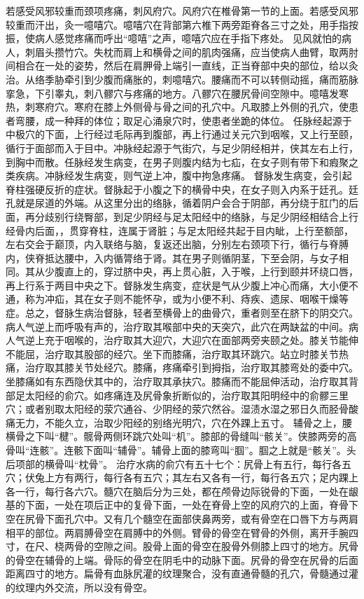 \documentclass[a4paper,12pt,UTF8,twoside]{ctexbook}
\begin{document}
若感受风邪较重而颈项疼痛，刺风府穴。风府穴在椎骨第一节的上面。若感受风邪较重而汗出，灸一噫嘻穴。噫嘻穴在背部第六椎下两旁距脊各三寸之处，用手指按振，使病人感觉疼痛而呼出“噫嘻”之声，噫嘻穴应在手指下疼处。
见风就怕的病人，刺眉头攒竹穴。失枕而肩上和横骨之间的肌肉强痛，应当使病人曲臂，取两肘间相合在一处的姿势，然后在肩胛骨上端引一直线，正当脊部中央的部位，给以灸治。从络季胁牵引到少腹而痛胀的，刺噫嘻穴。腰痛而不可以转侧动摇，痛而筋脉挛急，下引睾丸，刺八髎穴与疼痛的地方。八髎穴在腰尻骨间空隙中。噫嘻发寒热，刺寒府穴。寒府在膝上外侧骨与骨之间的孔穴中。凡取膝上外侧的孔穴，使患者弯腰，成一种拜的体位；取足心涌泉穴时，使患者坐跪的体位。
任脉经起源于中极穴的下面，上行经过毛际再到腹部，再上行通过关元穴到咽喉，又上行至颐，循行于面部而入于目中。冲脉经起源于气街穴，与足少阴经相并，侠其左右上行，到胸中而散。任脉经发生病变，在男子则腹内结为七疝，在女子则有带下和瘕聚之类疾病。冲脉经发生病变，则气逆上冲，腹中拘急疼痛。
督脉发生病变，会引起脊柱强硬反折的症状。督脉起于小腹之下的横骨中央，在女子则入内系于廷孔。廷孔就是尿道的外端。从这里分出的络脉，循着阴户会合于阴部，再分绕于肛门的后面，再分歧别行绕臀部，到足少阴经与足太阳经中的络脉，与足少阴经相结合上行经骨内后面，，贯穿脊柱，连属于肾脏；与足太阳经共起于目内眦，上行至额部，左右交会于巅顶，内入联络与脑，复返还出脑，分别左右颈项下行，循行与脊膊内，侠脊抵达腰中，入内循膂络于肾。其在男子则循阴茎，下至会阴，与女子相同。其从少腹直上的，穿过脐中央，再上贯心脏，入于喉，上行到颐并环绕口唇，再上行系于两目中央之下。督脉发生病变，症状是气从少腹上冲心而痛，大小便不通，称为冲疝，其在女子则不能怀孕，或为小便不利、痔疾、遗尿、咽喉干燥等症。总之，督脉生病治督脉，轻者至横骨上的曲骨穴，重者则至在脐下的阴交穴。
病人气逆上而呼吸有声的，治疗取其喉部中央的天突穴，此穴在两缺盆的中间。病人气逆上充于咽喉的，治疗取其大迎穴，大迎穴在面部两旁夹颐之处。膝关节能伸不能屈，治疗取其股部的经穴。坐下而膝痛，治疗取其环跳穴。站立时膝关节热痛，治疗取其膝关节处经穴。膝痛，疼痛牵引到拇指，治疗取其膝弯处的委中穴。坐膝痛如有东西隐伏其中的，治疗取其承扶穴。膝痛而不能屈伸活动，治疗取其背部足太阳经的俞穴。如疼痛连及尻骨象折断似的，治疗取其阳明经中的俞髎三里穴；或者别取太阳经的荥穴通谷、少阴经的荥穴然谷。湿渍水湿之邪日久而胫骨酸痛无力，不能久立，治取少阳经的别络光明穴，穴在外踝上五寸。
辅骨之上，腰横骨之下叫“楗”。髋骨两侧环跳穴处叫“机”。膝部的骨缝叫“骸关”。侠膝两旁的高骨叫“连骸”。连骸下面叫“辅骨”。辅骨上面的膝弯叫“腘”。腘之上就是“骸关”。头后项部的横骨叫“枕骨”。
治疗水病的俞穴有五十七个：尻骨上有五行，每行各五穴；伏兔上方有两行，每行各有五穴；其左右又各有一行，每行各五穴；足内踝上各一行，每行各六穴。髓穴在脑后分为三处，都在颅骨边际锐骨的下面，一处在龈基的下面，一处在项后正中的复骨下面，一处在脊骨上空的风府穴的上面，脊骨下空在尻骨下面孔穴中。又有几个髓空在面部侠鼻两旁，或有骨空在口唇下方与两肩相平的部位。两肩膊骨空在肩膊中的外侧。臂骨的骨空在臂骨的外侧，离开手腕四寸，在尺、桡两骨的空隙之间。股骨上面的骨空在股骨外侧膝上四寸的地方。尻骨的骨空在辅骨的上端。骨际的骨空在阴毛中的动脉下面。尻骨的骨空在尻骨的后面距离四寸的地方。扁骨有血脉尻灌的纹理聚合，没有直通骨髓的孔穴，骨髓通过灌的纹理内外交流，所以没有骨空。
\end{document}

